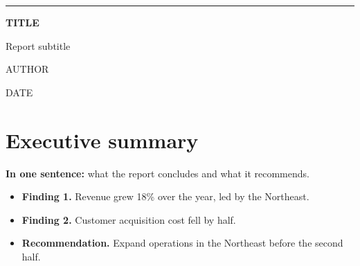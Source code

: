 \documentclass[11pt,a4paper]{report}
\begin{document}
\begin{titlepage}
  \pagecolor{tocaInk}\color{white}
  \vspace*{6cm}
  \hspace*{2.5cm}\begin{minipage}{0.75\paperwidth}
    {\color{tocaHoney}\rule{3cm}{5pt}}\par\vspace{1cm}
    {\fontsize{34}{40}\selectfont\bfseries {{TITLE}}\par}\vspace{0.6cm}
    {\Large Report subtitle\par}\vspace{3cm}
    {\large {{AUTHOR}}\par}\vspace{0.2cm}
    {\par}\vspace{0.2cm}
    {{DATE}}
  \end{minipage}
  \vfill
  \par\vspace{2cm}
  \restoregeometry
\end{titlepage}
\nopagecolor\color{black}

\chapter*{Executive summary}

\begin{destaque}
  \textbf{In one sentence:} what the report concludes and what it recommends.
\end{destaque}

\begin{itemize}
  \item \textbf{Finding 1.} Revenue grew 18\% over the year, led by the Northeast.
  \item \textbf{Finding 2.} Customer acquisition cost fell by half.
  \item \textbf{Recommendation.} Expand operations in the Northeast before the second half.
\end{itemize}

\tableofcontents
\end{document}
